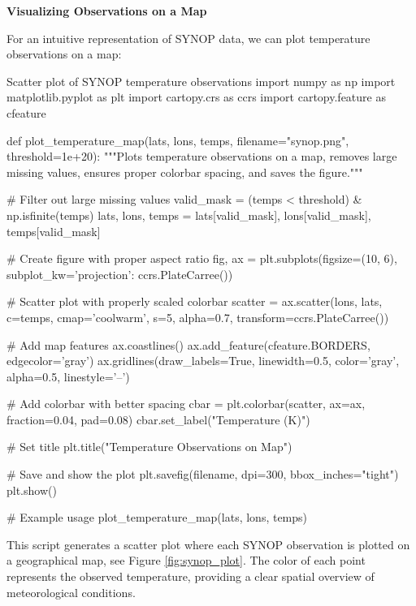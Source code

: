 \textbf{Visualizing Observations on a Map}

For an intuitive representation of SYNOP data, we can plot temperature observations on a map:

\begin{codeonly}{Scatter plot of SYNOP temperature observations}
import numpy as np
import matplotlib.pyplot as plt
import cartopy.crs as ccrs
import cartopy.feature as cfeature

def plot_temperature_map(lats, lons, temps, filename="synop.png", threshold=1e+20):
    """Plots temperature observations on a map, removes large missing values, ensures proper colorbar spacing, and saves the figure."""

    # Filter out large missing values
    valid_mask = (temps < threshold) & np.isfinite(temps)
    lats, lons, temps = lats[valid_mask], lons[valid_mask], temps[valid_mask]

    # Create figure with proper aspect ratio
    fig, ax = plt.subplots(figsize=(10, 6), subplot_kw={'projection': ccrs.PlateCarree()})

    # Scatter plot with properly scaled colorbar
    scatter = ax.scatter(lons, lats, c=temps, cmap='coolwarm', s=5, alpha=0.7, transform=ccrs.PlateCarree())

    # Add map features
    ax.coastlines()
    ax.add_feature(cfeature.BORDERS, edgecolor='gray')
    ax.gridlines(draw_labels=True, linewidth=0.5, color='gray', alpha=0.5, linestyle='--')

    # Add colorbar with better spacing
    cbar = plt.colorbar(scatter, ax=ax, fraction=0.04, pad=0.08)
    cbar.set_label("Temperature (K)")

    # Set title
    plt.title("Temperature Observations on Map")

    # Save and show the plot
    plt.savefig(filename, dpi=300, bbox_inches="tight")
    plt.show()

# Example usage
plot_temperature_map(lats, lons, temps)
\end{codeonly}

This script generates a scatter plot where each SYNOP observation is plotted on a geographical map, see Figure \ref{fig:synop_plot}. The color of each point represents the observed temperature, providing a clear spatial overview of meteorological conditions.


%
